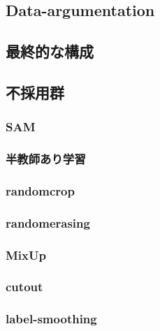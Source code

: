 \documentclass[a4paper,11pt]{jsarticle}
\begin{document}
\subsection{Data-argumentation}
\subsection{最終的な構成}
\subsection{不採用群}
\subsubsection{SAM}
\subsubsection{半教師あり学習}
\subsubsection{randomcrop}
\subsubsection{randomerasing}
\subsubsection{MixUp}
\subsubsection{cutout}
\subsubsection{label-smoothing}
\end{document}
